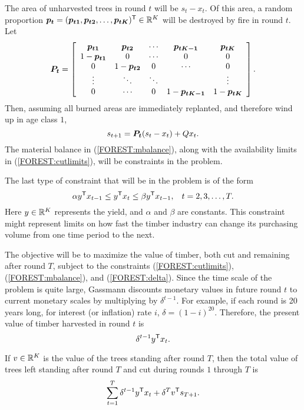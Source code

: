 The area of unharvested trees in round $t$ will be $s_t - x_t$.  Of this area, a random proportion $\mathbf{\boldsymbol{p_t}} = (\mathbf{\boldsymbol{p_{t1}}},\mathbf{\boldsymbol{p_{t2}}},\ldots,\mathbf{\boldsymbol{p_{tK}}})^{\mbox{\scriptsize\sf T}} \in {\mathbb R}^K$ will be destroyed by fire in round $t$.  Let
\[
\mathbf{\boldsymbol{P_t}} = \left[\begin{array}{ccccc}
	\mathbf{\boldsymbol{p_{t1}}}&\mathbf{\boldsymbol{p_{t2}}}& \cdots & \mathbf{\boldsymbol{p_{tK-1}}} & \mathbf{\boldsymbol{p_{tK}}}\\
	1-\mathbf{\boldsymbol{p_{t1}}}&0 & \cdots & 0 & 0\\
	0 & 1-\mathbf{\boldsymbol{p_{t2}}} & 0 & \cdots & 0\\
	\vdots & \ddots & \ddots &  & \vdots\\
	0 & \cdots & 0 & 1-\mathbf{\boldsymbol{p_{tK-1}}} & 1-\mathbf{\boldsymbol{p_{tK}}}
	\end{array}\right].
\]
Then, assuming all burned areas are immediately replanted, and therefore wind up in age class $1$,
\begin{equation}
\label{FOREST:mbalance}
s_{t+1} = \mathbf{\boldsymbol{P_t}}(s_t - x_t) + Qx_t.
\end{equation}
The material balance in (\ref{FOREST:mbalance}), along with the availability limits in (\ref{FOREST:cutlimits}), will be constraints in the problem.

The last type of constraint that will be in the problem is of the form
\begin{equation}
\label{FOREST:delta}
\alpha y^{\mbox{\scriptsize\sf T}} x_{t-1} \leq y^{\mbox{\scriptsize\sf T}} x_t \leq \beta y^{\mbox{\scriptsize\sf T}} x_{t-1}, \hspace{3mm} t=2,3,\ldots,T.
\end{equation}
Here $y \in {\mathbb R}^K$ represents the yield, and $\alpha$ and $\beta$ are constants.  This constraint might represent limits on how fast the timber industry can change its purchasing volume from one time period to the next.

The objective will be to maximize the value of timber, both cut and remaining after round $T$, subject to the constraints (\ref{FOREST:cutlimits}), (\ref{FOREST:mbalance}), and (\ref{FOREST:delta}).  Since the time scale of the problem is quite large, Gassmann discounts monetary values in future round $t$ to current monetary scales by multiplying by $\delta^{t-1}$.  For example, if each round is 20 years long, for interest (or inflation) rate $i$, $\delta=(1-i)^{20}$.  Therefore, the present value of timber harvested in round $t$ is 
\begin{equation*}
\delta^{t-1} y^{\mbox{\scriptsize\sf T}} x_t.
\end{equation*}

If $v \in {\mathbb R}^K$ is the value of the trees standing after round $T$, then the total value of trees left standing after round $T$ and cut during rounds $1$ through $T$ is
\begin{equation*}
\sum_{t=1}^T \delta^{t-1} y^{\mbox{\scriptsize\sf T}} x_t +  \delta^{T} v^{\mbox{\scriptsize\sf T}} s_{T+1}.
\end{equation*}

